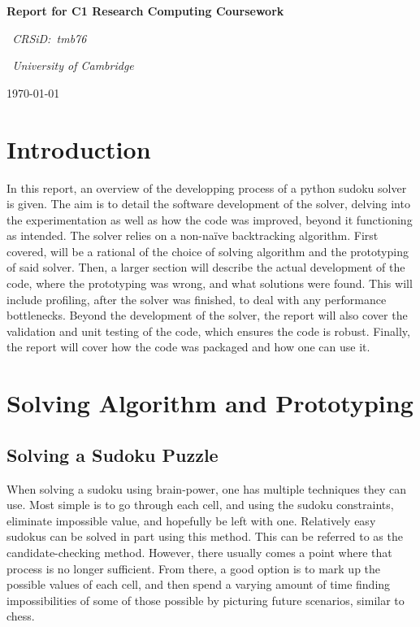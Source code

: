\documentclass[12pt]{report} %
\begin{document}
\begin{titlepage}
  \centering
  \vspace*{2cm}
  {\LARGE\bfseries Report for C1 Research Computing Coursework\par}
  \vspace{1cm}
  {\Large\itshape\ CRSiD:\ tmb76\par}
  \vspace{1cm}
  {\Large\itshape\ University of Cambridge\par}
  \vfill
  {\large\today\par}
\end{titlepage}

\tableofcontents

\newpage

\chapter{Introduction}

In this report, an overview of the developping process of a python sudoku solver is given. The aim is to detail the software development of the solver, delving into the experimentation as well as how the code was improved, beyond it functioning as intended. The solver relies on a non-naïve backtracking algorithm. First covered, will be a rational of the choice of solving algorithm and the prototyping of said solver. Then, a larger section will describe the actual development of the code, where the prototyping was wrong, and what solutions were found. This will include profiling, after the solver was finished, to deal with any performance bottlenecks. Beyond the development of the solver, the report will also cover the validation and unit testing of the code, which ensures the code is robust. Finally, the report will cover how the code was packaged and how one can use it.


\chapter{Solving Algorithm and Prototyping}

\section{Solving a Sudoku Puzzle}

When solving a sudoku using brain-power, one has multiple techniques they can use. Most simple is to go through each cell, and using the sudoku constraints, eliminate impossible value, and hopefully be left with one. Relatively easy sudokus can be solved in part using this method. This can be referred to as the candidate-checking method\cite{cornell_sudoku}.
However, there usually comes a point where that process is no longer sufficient. From there, a good option is to mark up the possible values of each cell, and then spend a varying amount of time finding impossibilities of some of those possible by picturing future scenarios, similar to chess\cite{cornell_sudoku}.
\end{document}
